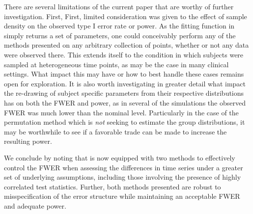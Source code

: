 There are several limitations of the current paper that are worthy of further investigation. First, First, limited consideration was given to the effect of sample density on the observed type I error rate or power. As the fitting function in  simply returns a set of parameters, one could conceivably perform any of the methods presented on any arbitrary collection of points, whether or not any data were observed there. This extends itself to the condition in which subjects were sampled at heterogeneous time points, as may be the case in many clinical settings. What impact this may have or how to best handle these cases remains open for exploration. It is also worth investigating in greater detail what impact the re-drawing of subject specific parameters from their respective distributions has on both the FWER and power, as in several of the simulations the observed FWER was much lower than the nominal level. Particularly in the case of the permutation method which is \textit{not} seeking to estimate the group distributions, it may be worthwhile to see if a favorable trade can be made to increase the resulting power.

We conclude by noting that  is now equipped with two methods to effectively control the FWER when assessing the differences in time series under a greater set of underlying assumptions, including those involving the presence of highly correlated test statistics. Further, both methods presented are robust to misspecification of the error structure while maintaining an acceptable FWER and adequate power. 


